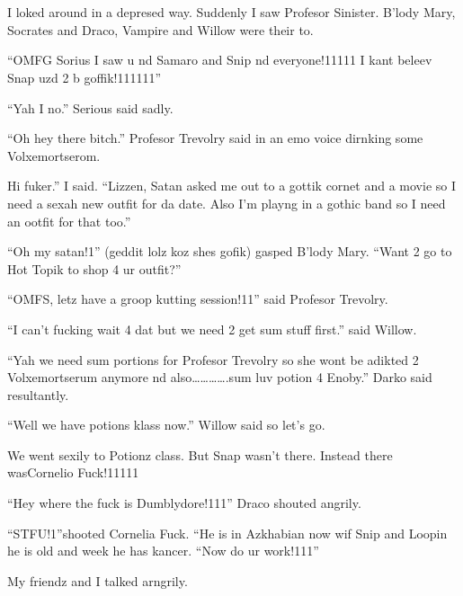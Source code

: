 \section{}


\XXX{\Xfill 666\Xfill}

I loked around in a depresed way. Suddenly I saw Profesor Sinister. B'lody Mary, Socrates and Draco, Vampire and Willow were their to.

\enquote{OMFG Sorius I saw u nd Samaro and Snip nd everyone!11111 I kant beleev Snap uzd 2 b goffik!111111}

\enquote{Yah I no.} Serious said sadly.

\enquote{Oh hey there bitch.} Profesor Trevolry said in an emo voice dirnking some Volxemortserom.

Hi fuker.'' I said. \enquote{Lizzen, Satan asked me out to a gottik cornet and a movie so I need a sexah new outfit for da date. Also I'm playng in a gothic band so I need an ootfit for that too.}

\enquote{Oh my satan!1} (geddit lolz koz shes gofik) gasped B'lody Mary. \enquote{Want 2 go to Hot Topik to shop 4 ur outfit?}

\begin{sloppypar}
    \enquote{OMFS, letz have a groop kutting session!11} said Profesor Trevolry.    
\end{sloppypar}

\enquote{I can't fucking wait 4 dat but we need 2 get sum stuff first.} said Willow.

\enquote{Yah we need sum portions for Profesor Trevolry so she wont be adikted 2 Volxemortserum anymore nd also………….sum luv potion 4 Enoby.} Darko said resultantly.

\enquote{Well we have potions klass now.} Willow said so let's go.

We went sexily to Potionz class. But Snap wasn't there. Instead there was\dotfill Cornelio Fuck!11111

\enquote{Hey where the fuck is Dumblydore!111} Draco shouted angrily.

\enquote{STFU\@!\@1\@}\@ shooted Cornelia Fuck. ``He is in Azkhabian now wif Snip and Loopin he is old and week he has kancer. \enquote{Now do ur work!111}

My friendz and I talked arngrily.

